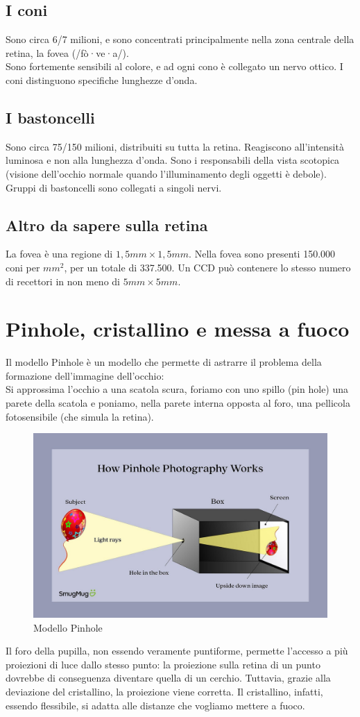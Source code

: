 \documentclass{report}
\begin{document}
	\subsection{I coni}
	Sono circa 6/7 milioni, e sono concentrati principalmente nella zona centrale della retina, la fovea (/fò·ve·a/).\\
	Sono fortemente sensibili al colore, e ad ogni cono è collegato un nervo ottico. I coni distinguono specifiche lunghezze d'onda.
	\subsection{I bastoncelli}
	Sono circa 75/150 milioni, distribuiti su tutta la retina.
	Reagiscono all'intensità luminosa e non alla lunghezza d'onda. Sono i responsabili della vista scotopica (visione dell'occhio normale quando l'illuminamento degli oggetti è debole). Gruppi di bastoncelli sono collegati a singoli nervi.
	\subsection{Altro da sapere sulla retina}
	La fovea è una regione di $1,5 mm \times 1,5 mm$.
	Nella fovea sono presenti 150.000 coni per $mm^2$, per un totale di 337.500.
	Un CCD può contenere lo stesso numero di recettori in non meno di $5mm \times 5mm$.
	\section{Pinhole, cristallino e messa a fuoco}
	Il modello Pinhole è un modello che permette di astrarre il problema della formazione dell'immagine dell'occhio:\\
	Si approssima l'occhio a una scatola scura, foriamo con uno spillo (pin hole) una parete della scatola e poniamo, nella parete interna opposta al foro, una pellicola fotosensibile (che simula la retina).
	\begin{figure}[htp]
		\centering
		\includegraphics[width=0.57\linewidth]{pinhole.jpeg}
		\caption{Modello Pinhole}
	\end{figure}
	Il foro della pupilla, non essendo veramente puntiforme, permette l'accesso a più proiezioni di luce dallo stesso punto: la proiezione sulla retina di un punto dovrebbe di conseguenza diventare quella di un cerchio. Tuttavia, grazie alla deviazione del cristallino, la proiezione viene corretta. Il cristallino, infatti, essendo flessibile, si adatta alle distanze che vogliamo mettere a fuoco. 
	
\end{document}
